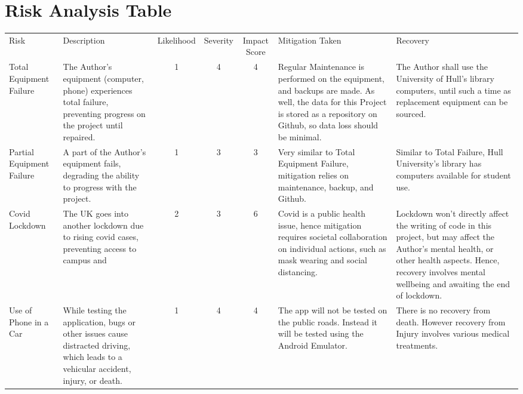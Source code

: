 \documentclass[11pt, a4paper, notitlepage]{report}
\begin{document}
\chapter{Risk Analysis Table}\label{app:RiskAnalysis}
\begin{table}
    \begin{tabular}{p{} p{} c c c p{} p{}}
        Risk &
        Description &
        Likelihood &
        Severity &
        Impact Score &
        Mitigation Taken &
        Recovery \\
        Total Equipment Failure &
        The Author's equipment (computer, phone) experiences total failure, preventing progress on the project until repaired. &
        1 &
        4 &
        4 &
        Regular Maintenance is performed on the equipment, and backups are made. As well, the data for this Project is stored as a repository on Github, so data loss should be minimal. &
        The Author shall use the University of Hull's library computers, until such a time as replacement equipment can be sourced. \\
        Partial Equipment Failure &
        A part of the Author's equipment fails, degrading the ability to progress with the project. &
        1 &
        3 &
        3 &
        Very similar to Total Equipment Failure, mitigation relies on maintenance, backup, and Github. &
        Similar to Total Failure, Hull University's library has computers available for student use. \\
        Covid Lockdown &
        The UK goes into another lockdown due to rising covid cases, preventing access to campus and &
        2 &
        3 &
        6 &
        Covid is a public health issue, hence mitigation requires societal collaboration on individual actions, such as mask wearing and social distancing. &
        Lockdown won't directly affect the writing of code in this project, but may affect the Author's mental health, or other health aspects. Hence, recovery involves mental wellbeing and awaiting the end of lockdown. \\
        Use of Phone in a Car &
        While testing the application, bugs or other issues cause distracted driving, which leads to a vehicular accident, injury, or death. &
        1 &
        4 &
        4 &
        The app will not be tested on the public roads. Instead it will be tested using the Android Emulator. &
        There is no recovery from death. However recovery from Injury involves various medical treatments. \\

\end{tabular}
\end{table}
\end{document}
